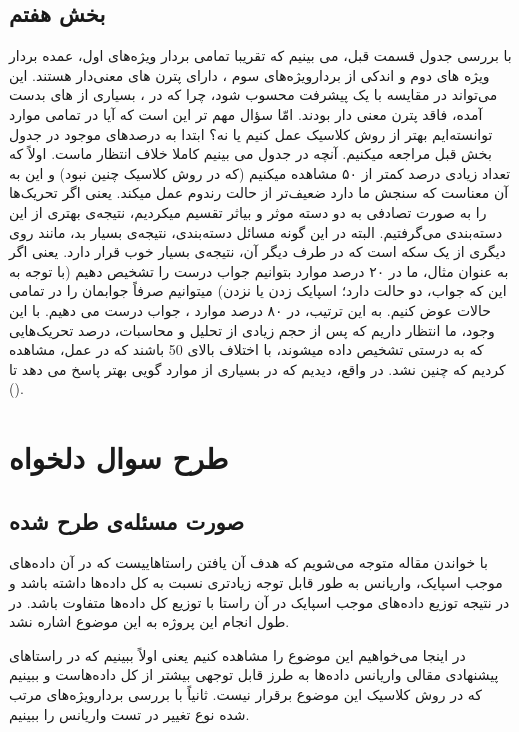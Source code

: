 \documentclass[12pt,onecolumn,a4paper,fleqn]{article}
\begin{document}
\subsection{بخش هفتم}
با بررسی جدول قسمت قبل، می بینیم که تقریبا تمامی بردار ویژه‌های اول، عمده بردار ویژه های دوم و اندکی از بردارویژه‌های سوم ، دارای پترن های معنی‌دار هستند. این می‌تواند در مقایسه با  یک پیشرفت محسوب شود، چرا که در  ، بسیاری از  های بدست آمده، فاقد پترن معنی دار بودند.
امّا سؤال مهم تر این است که آیا در تمامی موارد توانسته‌ایم بهتر از روش کلاسیک عمل کنیم یا نه؟ ابتدا به درصدهای موجود در جدول بخش قبل مراجعه میکنیم. آنچه در جدول می بینیم کاملا خلاف انتظار ماست. اولاً که تعداد زیادی درصد کمتر از ۵۰ مشاهده میکنیم (که در روش کلاسیک چنین نبود) و این به آن معناست که سنجش ما دارد ضعیف‌تر از حالت رندوم عمل میکند. یعنی اگر تحریک‌ها را به صورت تصادفی به دو دسته موثر و بیاثر تقسیم میکردیم، نتیجه‌ی بهتری از این دسته‌بندی می‌گرفتیم. البته در این گونه مسائل دسته‌بندی، نتیجه‌ی بسیار بد، مانند روی دیگری از یک سکه است که در طرف دیگر آن، نتیجه‌ی بسیار خوب قرار دارد. یعنی اگر به عنوان مثال، ما در ۲۰ درصد موارد بتوانیم جواب درست را تشخیص دهیم (با توجه به این که جواب، دو حالت دارد؛ اسپایک زدن یا نزدن) میتوانیم صرفاً جوابمان را در تمامی حالات عوض کنیم. به این ترتیب، در ۸۰ درصد موارد ، جواب درست می دهیم. با این وجود، ما انتظار داریم که پس از حجم زیادی از تحلیل و محاسبات، درصد تحریک‌هایی که به درستی تشخیص داده میشوند، با اختلاف بالای 50 باشند که در عمل، مشاهده کردیم که چنین نشد. در واقع، دیدیم که در بسیاری از موارد گویی  بهتر پاسخ می دهد تا
().

\pagebreak

\section{طرح سوال‌ دلخواه}
\subsection{صورت مسئله‌ی طرح شده}
با خواندن مقاله متوجه می‌شویم که هدف آن یافتن راستا‌هاییست که در آن داده‌های موجب اسپایک، واریانس به طور قابل‌ توجه زیادتری نسبت به کل داده‌ها داشته باشد و در نتیجه توزیع داده‌های موجب اسپایک در آن راستا با توزیع کل داده‌ها متفاوت باشد. در طول انجام این پروژه به این موضوع اشاره نشد. 

در اینجا می‌خواهیم این موضوع را مشاهده کنیم یعنی اولاً ببینیم که در راستاهای پیشنهادی مقالی واریانس داده‌ها به طرز قابل توجهی بیشتر از کل داده‌هاست و ببینیم که در روش کلاسیک  این موضوع برقرار نیست. ثانیاً با بررسی بردارویژه‌های مرتب شده نوع تغییر  در تست واریانس را ببینیم.
\end{document}
